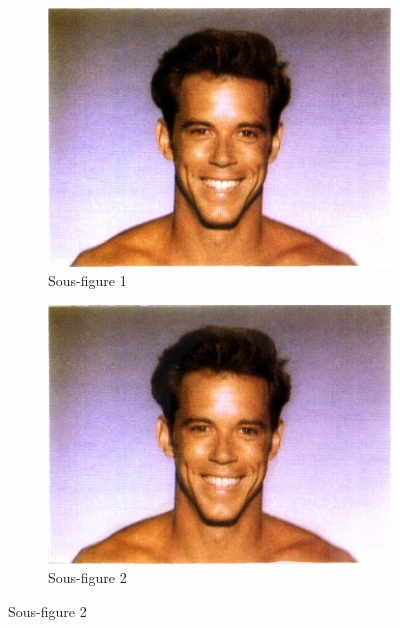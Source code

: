 \begin{figure}[h!]
    \centering
    \begin{subfigure}{0.45\textwidth}
        \includegraphics[width=\textwidth]{img/testvisuel/frame0.png}
        \caption{Sous-figure 1}
    \end{subfigure}
    \hfill
    \begin{subfigure}{0.45\textwidth}
        \includegraphics[width=\textwidth]{img/testvisuel/frame1.png}
        \caption{Sous-figure 2}
    \end{subfigure}
    

\end{figure}
